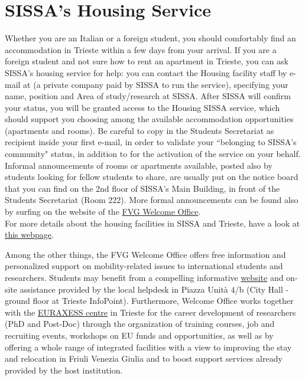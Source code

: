 \documentclass{sissavademecum}
\begin{document}
\section{SISSA's Housing Service}

Whether you are an Italian or a foreign student, you should comfortably find an accommodation in Trieste within a few days from your arrival. If you are a foreign student and not sure how to rent an apartment in Trieste, you can ask SISSA's housing service for help: you can contact the Housing facility staff by e-mail at  (a private company paid by SISSA to run the service), specifying your name, position and Area of study/research at SISSA. After SISSA will confirm your status, you will be granted access to the Housing SISSA service, which should support you choosing among the available accommodation opportunities (apartments and rooms). Be careful to copy in the Students Secretariat as recipient inside your first e-mail, in order to validate your ``belonging to SISSA’s community" status, in addition to  for the activation of the service on your behalf. \\
Informal announcements of rooms or apartments available, posted also by students looking for fellow students to share, are usually put on the notice board that you can find on the 2nd floor of SISSA's Main Building, in front of the Students Secretariat (Room 222). More formal announcements can be found also by surfing on the website of the \href{http://www.welcomeoffice.fvg.it/practical-info/accommodation/}{FVG Welcome Office}. \\
For more details about the housing facilities in SISSA and Trieste, have a look at \href{https://www.sissa.it/housing}{this webpage}.

Among the other things, the FVG Welcome Office offers free information and personalized support on mobility-related issues to international students and researchers. Students may benefit from a compelling informative \href{link http://www.welcomeoffice.fvg.it/news/}{website} and on-site assistance provided by the local helpdesk in Piazza Unit\`a $4$/b (City Hall - ground floor at Trieste InfoPoint). Furthermore, Welcome Office works together with the \href{https://euraxess.ec.europa.eu/}{EURAXESS centre} in Trieste for the career development of researchers (PhD and Post-Doc) through the organization of training courses, job and recruiting events, workshops on EU funds and opportunities, as well as by offering a whole range of integrated facilities with a view to improving the stay and relocation in Friuli Venezia Giulia and to boost support services already provided by the host institution. 
\end{document}
